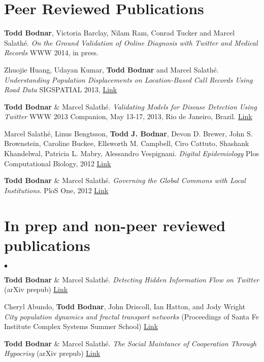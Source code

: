 \documentclass[margin,line]{res}
\newcommand{\linkToUrl}[1]{{\color{blue}\underline{\href{#1}{Link}}}}
\newenvironment{list2}{
  \begin{list}{$\bullet$}{%
      \setlength{\itemsep}{0in}
      \setlength{\parsep}{0in} \setlength{\parskip}{0in}
      \setlength{\topsep}{0in} \setlength{\partopsep}{0in} 
      \setlength{\leftmargin}{10pt}}}{\end{list}}
\begin{document}
\begin{resume}
\section{\sc Peer Reviewed Publications}

\begin{etaremune}[start=5,leftmargin=13pt]

\item \textbf{Todd Bodnar}, Victoria Barclay, Nilam Ram, Conrad Tucker and Marcel Salath\'e. \textit{On the Ground Validation of Online Diagnosis with Twitter and Medical Records} WWW 2014, in press.

\item Zhuojie Huang, Udayan Kumar, \textbf{Todd Bodnar} and Marcel Salath\'e. \textit{Understanding Population Displacements on Location-Based Call Records Using Road Data} SIGSPATIAL 2013, \linkToUrl{http://bit.ly/1dAjC5o}

\item \textbf{Todd Bodnar} \& Marcel Salath\'e. \textit{Validating Models for Disease Detection Using Twitter}  WWW 2013 Companion, May 13-17, 2013, Rio de Janeiro, Brazil. \linkToUrl{http://bit.ly/WWL1Gr}

\item Marcel Salath\'e, Linus Bengtsson, \textbf{Todd J. Bodnar}, Devon D. Brewer, John S. Brownstein, Caroline Buckee, Ellsworth M. Campbell, Ciro Cattuto, Shashank Khandelwal, Patricia L. Mabry,  Alessandro Vespignani. \textit{Digital Epidemiology} Plos Computational Biology, 2012 \linkToUrl{http://bitly.com/PO2fSx}

\item \textbf{Todd Bodnar} \& Marcel Salath\'e. \textit{Governing the Global Commons with Local Institutions}. PloS One, 2012 \linkToUrl{http://bit.ly/TtsZd5}
\end{etaremune}

\section{\sc In prep and non-peer reviewed publications}

\begin{list2}
\item \textbf{Todd Bodnar} \& Marcel Salath\'e. \textit{Detecting Hidden Information Flow on Twitter} (arXiv prepub) \linkToUrl{http://bit.ly/Yr965L}
\item Cheryl Abundo, \textbf{Todd Bodnar}, John Driscoll, Ian Hatton, and Jody Wright
 \textit{City population dynamics and fractal transport networks} (Proceedings of Santa Fe Institute Complex Systems Summer School) \linkToUrl{bit.ly/19A22vY}%
\item \textbf{Todd Bodnar} \& Marcel Salath\'e. \textit{The Social Maintance of Cooperation Through Hypocrisy} (arXiv prepub) \linkToUrl{http://bit.ly/Yr965L}
\end{list2}


\end{resume}
\end{document}
